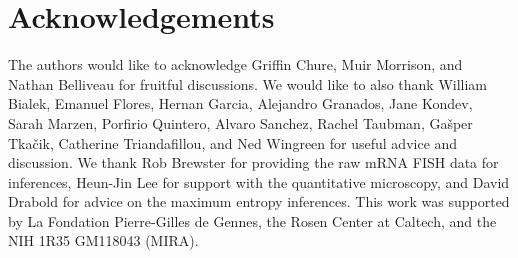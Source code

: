 \section*{Acknowledgements}

The authors would like to acknowledge Griffin Chure, Muir Morrison, and Nathan
Belliveau for fruitful discussions. We would like to also thank William Bialek,
Emanuel Flores, Hernan Garcia, Alejandro Granados, Jane Kondev, Sarah Marzen,
Porfirio Quintero, Alvaro Sanchez, Rachel Taubman, Gašper Tkačik, Catherine
Triandafillou, and Ned Wingreen for useful advice and discussion. We thank Rob
Brewster for providing the raw mRNA FISH data for inferences, Heun-Jin Lee for
support with the quantitative microscopy, and David Drabold for advice on the
maximum entropy inferences. This work was supported by La Fondation
Pierre-Gilles de Gennes, the Rosen Center at Caltech, and the NIH 1R35 GM118043
(MIRA).
